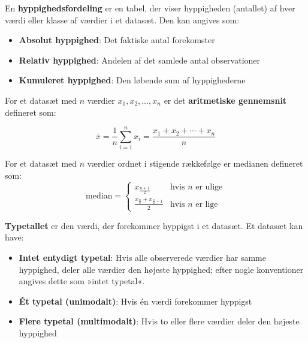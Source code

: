 \begin{definition}[Hyppighedsfordeling]
En \textbf{hyppighedsfordeling} er en tabel, der viser hyppigheden (antallet) af hver værdi eller klasse af værdier i et datasæt. Den kan angives som:
\begin{itemize}
    \item \textbf{Absolut hyppighed}: Det faktiske antal forekomster
    \item \textbf{Relativ hyppighed}: Andelen af det samlede antal observationer
    \item \textbf{Kumuleret hyppighed}: Den løbende sum af hyppighederne
\end{itemize}
\end{definition}

\begin{definition}

For et datasæt med $n$ værdier $x_1, x_2, \ldots, x_n$ er det \textbf{aritmetiske gennemsnit} defineret som:

$$
\bar{x} = \frac{1}{n}\sum_{i=1}^{n} x_i = \frac{x_1 + x_2 + \cdots + x_n}{n}
$$

\end{definition}

\begin{definition}[Median]
    For et datasæt med $n$ værdier ordnet i stigende rækkefølge er medianen defineret som:
    \[
    \text{median} =
    \begin{cases}
        x_{\frac{n+1}{2}} & \text{hvis } n \text{ er ulige} \\
        \frac{x_{\frac{n}{2}} + x_{\frac{n}{2}+1}}{2} & \text{hvis } n \text{ er lige}
    \end{cases}
    \]
\end{definition}

\begin{definition}[Typetal]
\textbf{Typetallet} er den værdi, der forekommer hyppigst i et datasæt. Et datasæt kan have:
\begin{itemize}
    \item \textbf{Intet entydigt typetal}: Hvis alle observerede værdier har samme hyppighed, deler alle værdier den højeste hyppighed; efter nogle konventioner angives dette som »intet typetal«.
    \item \textbf{Ét typetal (unimodalt)}: Hvis én værdi forekommer hyppigst
    \item \textbf{Flere typetal (multimodalt)}: Hvis to eller flere værdier deler den højeste hyppighed
\end{itemize}
\end{definition}

